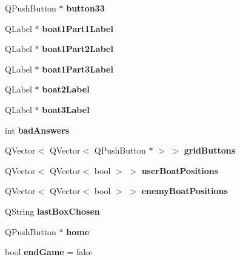 \begin{DoxyCompactItemize}
Q\+Push\+Button $\ast$ {\bfseries button33}
\item 
\mbox{\label{classGame1GamePage_a2b2c1855a0da027deec667c11fb7ec4e}} 
Q\+Label $\ast$ {\bfseries boat1\+Part1\+Label}
\item 
\mbox{\label{classGame1GamePage_abee94a06eb70b1d56f275a827a3ea8c1}} 
Q\+Label $\ast$ {\bfseries boat1\+Part2\+Label}
\item 
\mbox{\label{classGame1GamePage_ab7a34c4aeb0dcee242f7552bfe365c0e}} 
Q\+Label $\ast$ {\bfseries boat1\+Part3\+Label}
\item 
\mbox{\label{classGame1GamePage_add9cc20ff675a3af2214434ade38e812}} 
Q\+Label $\ast$ {\bfseries boat2\+Label}
\item 
\mbox{\label{classGame1GamePage_a24c75dff3dfec462f172896e2044d971}} 
Q\+Label $\ast$ {\bfseries boat3\+Label}
\item 
\mbox{\label{classGame1GamePage_a62f04a32d802bbe089451d469fe77f25}} 
int {\bfseries bad\+Answers}
\item 
\mbox{\label{classGame1GamePage_ad70ff23f6015867d84e69e432aaffac7}} 
Q\+Vector$<$ Q\+Vector$<$ Q\+Push\+Button $\ast$ $>$ $>$ {\bfseries grid\+Buttons}
\item 
\mbox{\label{classGame1GamePage_a61d460be2f955377e656d7bfbf58aec1}} 
Q\+Vector$<$ Q\+Vector$<$ bool $>$ $>$ {\bfseries user\+Boat\+Positions}
\item 
\mbox{\label{classGame1GamePage_a4fb0a4e7d44b86217db2775ae38b0c88}} 
Q\+Vector$<$ Q\+Vector$<$ bool $>$ $>$ {\bfseries enemy\+Boat\+Positions}
\item 
\mbox{\label{classGame1GamePage_a59e7ce71a4b0672fb49e6cdf927baac4}} 
Q\+String {\bfseries last\+Box\+Chosen}
\item 
\mbox{\label{classGame1GamePage_ac2a5bcec1e786a3ce95dff0ce2c0a8a3}} 
Q\+Push\+Button $\ast$ {\bfseries home}
\item 
\mbox{\label{classGame1GamePage_afa6f1549edcf760257511c2e14862e6b}} 
bool {\bfseries end\+Game} = false
\end{DoxyCompactItemize}


